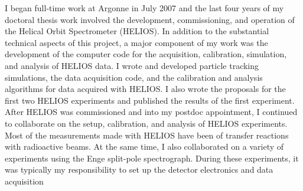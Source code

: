 I began full-time work at Argonne in July 2007 and the last four years of my doctoral thesis work involved the
 development, commissioning, and operation of the Helical Orbit Spectrometer (HELIOS).
In addition to the substantial technical aspects of this project,
 a major component of my work was the development of the computer code for the acquisition, calibration, simulation, and analysis of HELIOS data. 
I wrote and developed particle tracking simulations, %
 the data acquisition code, and %
 the calibration and analysis algorithms for data acquired with HELIOS. 
 I also wrote the proposals for the first two HELIOS experiments and published the results of the first experiment.
After HELIOS was commissioned and into my postdoc appointment, I continued to collaborate on %
the setup, calibration, and analysis of HELIOS experiments. %
Most of the measurements made with HELIOS have been of transfer reactions with radioactive beams.
At the same time, I also collaborated on a variety of experiments using the Enge split-pole spectrograph. During these experiments, it was typically my responsibility to set up the detector electronics and data acquisition 

